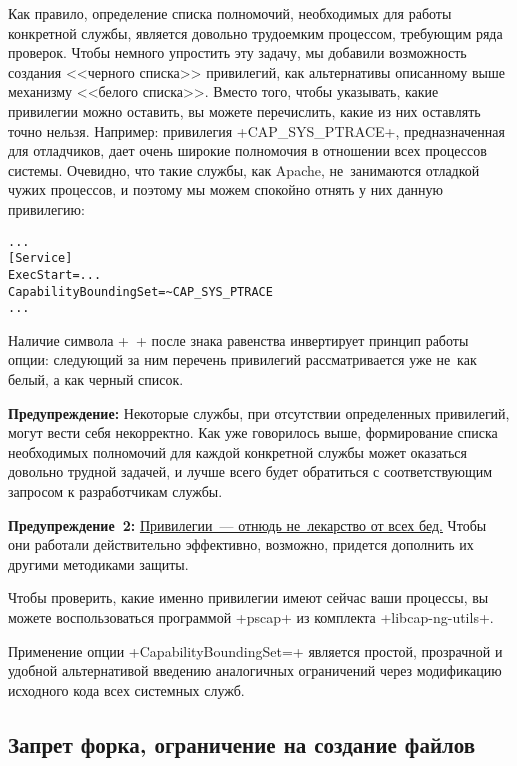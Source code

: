 \documentclass[10pt,oneside,a4paper]{article}
\newenvironment{caveat}[1][]{\smallskip\par\textbf{Предупреждение#1: }}%
	{\smallskip\par}
\begin{document}
Как правило, определение списка полномочий, необходимых для работы конкретной
службы, является довольно трудоемким процессом, требующим ряда проверок. Чтобы
немного упростить эту задачу, мы добавили возможность создания <<черного
списка>> привилегий, как альтернативы описанному выше механизму <<белого
списка>>. Вместо того, чтобы указывать, какие привилегии можно оставить, вы
можете перечислить, какие из них оставлять точно нельзя. Например: привилегия
+CAP_SYS_PTRACE+, предназначенная для отладчиков, дает очень широкие полномочия
в отношении всех процессов системы. Очевидно, что такие службы, как Apache,
не~занимаются отладкой чужих процессов, и поэтому мы можем спокойно отнять у них
данную привилегию:
\begin{Verbatim}
...
[Service]
ExecStart=...
CapabilityBoundingSet=~CAP_SYS_PTRACE
...
\end{Verbatim}
Наличие символа +~+ после знака равенства инвертирует принцип работы опции:
следующий за ним перечень привилегий рассматривается уже не~как белый, а как
черный список.

\begin{caveat}
Некоторые службы, при отсутствии определенных привилегий, могут вести себя
некорректно. Как уже говорилось выше, формирование списка необходимых полномочий
для каждой конкретной службы может оказаться довольно трудной задачей, и лучше
всего будет обратиться с соответствующим запросом к разработчикам службы.
\end{caveat}

\begin{caveat}[~2]
\href{https://forums.grsecurity.net/viewtopic.php?f=7&t=2522}{Привилегии~---
отнюдь не~лекарство от всех бед.} Чтобы они работали действительно эффективно,
возможно, придется дополнить их другими методиками защиты.
\end{caveat}

Чтобы проверить, какие именно привилегии имеют сейчас ваши процессы, вы можете
воспользоваться программой +pscap+ из комплекта +libcap-ng-utils+.

Применение опции +CapabilityBoundingSet=+ является простой, прозрачной и удобной
альтернативой введению аналогичных ограничений через модификацию исходного кода
всех системных служб.

\subsection{Запрет форка, ограничение на создание файлов}
\end{document}
